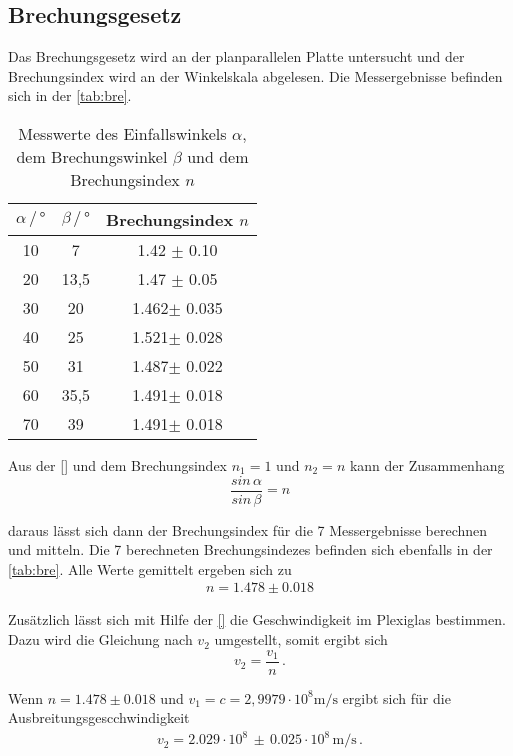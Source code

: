 \subsection{Brechungsgesetz}
Das Brechungsgesetz wird an der planparallelen Platte untersucht und der Brechungsindex wird an der Winkelskala abgelesen. Die Messergebnisse befinden sich in der \autoref{tab:bre}. 
\begin{table}
    \centering
    \caption{Messwerte des Einfallswinkels $\alpha$, dem Brechungswinkel $\beta$ und dem Brechungsindex $n$}
    \label{tab:bre}
    \begin{tabular}{c c c}
    \toprule
         $\alpha \, / \, ° $ & $\beta \, / \, °$ & Brechungsindex $n$\\
    \midrule
    10 & 7    & 1.42 $\pm$ 0.10\\
    20 & 13,5 & 1.47 $\pm$ 0.05\\
    30 & 20   & 1.462$\pm$ 0.035\\
    40 & 25   & 1.521$\pm$ 0.028\\
    50 & 31   & 1.487$\pm$ 0.022\\
    60 & 35,5 & 1.491$\pm$ 0.018\\
    70 & 39   & 1.491$\pm$ 0.018\\
    \bottomrule
    \end{tabular}
\end{table}

\noindent
Aus der \autoref{} und dem Brechungsindex $n_1 = 1$ und $n_2 = n$ kann der Zusammenhang 
\begin{equation}
    \frac{sin \, \alpha}{sin \, \beta} = n
\end{equation}

\noindent
daraus lässt sich dann der Brechungsindex für die 7 Messergebnisse berechnen und mitteln. Die 7 berechneten Brechungsindezes befinden sich ebenfalls in der \autoref{tab:bre}.
Alle Werte gemittelt ergeben sich zu 
\begin{align*}
    n = 1.478 \pm 0.018
\end{align*} 

Zusätzlich lässt sich mit Hilfe der \autoref{} die Geschwindigkeit im Plexiglas bestimmen. Dazu wird die Gleichung nach $v_2$ umgestellt, somit ergibt sich
\begin{equation}
    v_2 = \frac{v_1}{n} \, .
\end{equation}

\noindent
Wenn $n = 1.478 \pm 0.018$ und $v_1 = c = 2,9979 \cdot 10^8 \si{\meter\per\second}$ ergibt sich für die Ausbreitungsgescchwindigkeit
\begin{align*}
    v_2 = 2.029 \cdot 10^8 \, \pm \, 0.025 \cdot 10^8 \, \si{\meter\per\second} \, .
\end{align*}

